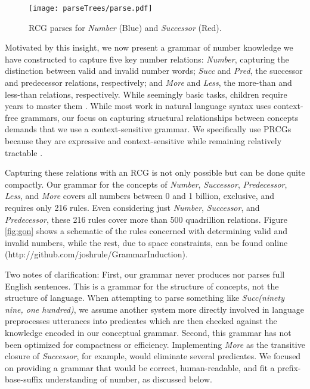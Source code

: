 \documentclass[10pt,letterpaper]{article}
\begin{document}
\begin{figure}[t]
  \begin{centering}
    \texttt{[image: parseTrees/parse.pdf]}
    \caption{RCG parses for \emph{Number} (Blue) and \emph{Successor} (Red).}
    \label{fig:parse}
  \end{centering}
\end{figure}

Motivated by this insight, we now present a grammar of number
knowledge we have constructed to capture five key number relations:
\emph{Number}, capturing the distinction between valid and invalid
number words; \emph{Succ} and \emph{Pred}, the successor and
predecessor relations, respectively; and \emph{More} and \emph{Less},
the more-than and less-than relations, respectively. While seemingly
basic tasks, children require years to master them
\citep{FusRicBriar1982}. While most work in natural language syntax
uses context-free grammars, our focus on capturing structural
relationships between concepts demands that we use a context-sensitive
grammar. We specifically use PRCGs because they are expressive and
context-sensitive while remaining relatively tractable
\citep{boullier2005range}.



Capturing these relations with an RCG is not only possible but can
be done quite compactly. Our grammar for the concepts of
\emph{Number}, \emph{Successor}, \emph{Predecessor}, \emph{Less}, and
\emph{More} covers all numbers between 0 and 1 billion, exclusive, and
requires only 216 rules. Even considering just \emph{Number},
\emph{Successor}, and \emph{Predecessor}, these 216 rules cover more
than 500 quadrillion relations. Figure \ref{fig:gon} shows a schematic
of the rules concerned with determining valid and invalid numbers,
while the rest, due to space constraints, can be found
online (http://github.com/joshrule/GrammarInduction).

Two notes of clarification: First, our grammar never produces nor
parses full English sentences. This is a grammar for the structure of
concepts, not the structure of language. When attempting to parse
something like \emph{Succ(ninety nine, one hundred)}, we assume
another system more directly involved in language preprocesses
utterances into predicates which are then checked against the
knowledge encoded in our conceptual grammar. Second, this grammar has
not been optimized for compactness or efficiency. Implementing
\emph{More} as the transitive closure of \emph{Successor}, for
example, would eliminate several predicates. We focused on providing a
grammar that would be correct, human-readable, and fit a
prefix-base-suffix understanding of number, as discussed below.
\end{document}
